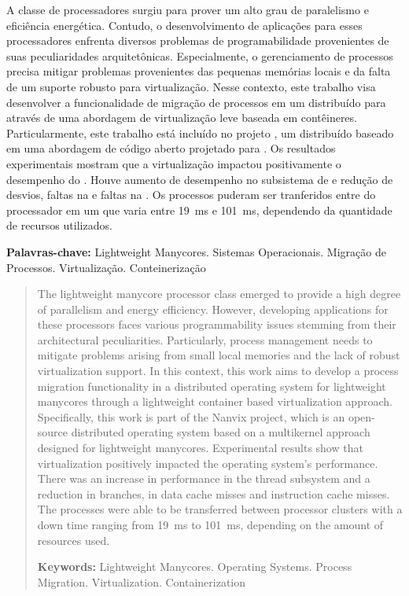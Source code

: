 \begin{resumo}[Resumo]
  A classe de processadores \lw surgiu para prover um alto grau de paralelismo e eficiência energética. Contudo, o desenvolvimento de aplicações para esses processadores enfrenta diversos problemas de programabilidade provenientes de suas peculiaridades arquitetônicas. Especialmente, o gerenciamento de processos precisa mitigar problemas provenientes das pequenas memórias locais e da falta de um suporte robusto para virtualização. Nesse contexto, este trabalho visa desenvolver a funcionalidade de migração de processos em um \os distribuído para \lws através de uma abordagem de virtualização leve baseada em contêineres. Particularmente, este trabalho está incluído no projeto \nanvix, um \os distribuído baseado em uma abordagem \multikernel de código aberto projetado para \lws. Os resultados experimentais mostram que a virtualização impactou positivamente o desempenho do \so. Houve aumento de desempenho no subsistema de \threads e redução de desvios, faltas na \dcache e faltas na \icache. Os processos puderam ser tranferidos entre \clusters do processador em um \downtime que varia entre 19~ms e 101~ms, dependendo da quantidade de recursos utilizados.

  \vspace{\baselineskip} 
  \textbf{Palavras-chave:} Lightweight Manycores. Sistemas Operacionais. Migração de Processos. Virtualização. Conteinerização
\end{resumo}

\begin{abstract}
  
The lightweight manycore processor class emerged to provide a high degree of parallelism and energy efficiency. However, developing applications for these processors faces various programmability issues stemming from their architectural peculiarities. Particularly, process management needs to mitigate problems arising from small local memories and the lack of robust virtualization support. In this context, this work aims to develop a process migration functionality in a distributed operating system for lightweight manycores through a lightweight container based virtualization approach. Specifically, this work is part of the Nanvix project, which is an open-source  distributed operating system based on a multikernel approach designed for lightweight manycores. Experimental results show that virtualization positively impacted the operating system's performance. There was an increase in performance in the thread subsystem and a reduction in branches, in data cache misses and instruction cache misses. The processes were able to be transferred between processor clusters with a down time ranging from 19~ms to 101~ms, depending on the amount of resources used.

  \vspace{\baselineskip} 
  \textbf{Keywords:} Lightweight Manycores. Operating Systems. Process Migration. Virtualization. Containerization
\end{abstract}
